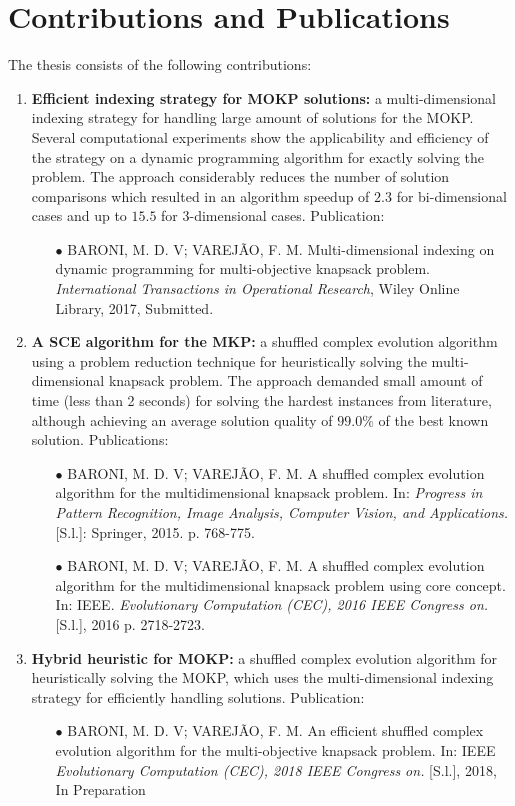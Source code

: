 \section{Contributions and Publications}

The thesis consists of the following contributions:
\begin{enumerate}
\item{
\textbf{Efficient indexing strategy for MOKP solutions:}
a multi-dimensional indexing strategy for handling large amount
of solutions for the MOKP.
Several computational experiments show the applicability and efficiency
of the strategy on a dynamic programming algorithm for exactly solving
the problem.
The approach considerably reduces the number of solution
comparisons which resulted in an algorithm speedup of $2.3$ for
bi-dimensional cases and up to $15.5$ for 3-dimensional cases.
Publication:
\begin{itemize}
 \item[{\tiny$\bullet$}] { BARONI, M. D. V; VAREJ\~AO, F. M. Multi-dimensional indexing on dynamic programming for multi-objective knapsack problem. \textit{International Transactions in Operational Research}, Wiley Online Library, 2017, Submitted. }
\end{itemize}
}
\item{
\textbf{A SCE algorithm for the MKP:}
a shuffled complex evolution algorithm using a
problem reduction technique for heuristically solving the multi-dimensional
knapsack problem.
The approach demanded small amount of time (less than 2 seconds)
for solving the hardest instances from literature,
although achieving an average solution quality of $99.0\%$
of the best known solution.
Publications:
\begin{itemize}
  \item[{\tiny$\bullet$}] { BARONI, M. D. V; VAREJ\~AO, F. M. A shuffled complex evolution algorithm
  for the multidimensional knapsack problem. In: \textit{Progress in Pattern Recognition, Image Analysis, Computer Vision, and Applications.} [S.l.]: Springer, 2015. p. 768-775. }
 \item[{\tiny$\bullet$}] { BARONI, M. D. V; VAREJ\~AO, F. M. A shuffled complex evolution algorithm
  for the multidimensional knapsack problem using core concept. In: IEEE. \textit{Evolutionary Computation (CEC), 2016 IEEE Congress on.} [S.l.], 2016 p. 2718-2723. }
\end{itemize}
}
\item{
\textbf{Hybrid heuristic for MOKP:}
a shuffled complex evolution algorithm for
heuristically solving the MOKP, which uses the multi-dimensional
indexing strategy for efficiently handling solutions.
Publication:
\begin{itemize}
 \item[{\tiny$\bullet$}] { BARONI, M. D. V; VAREJ\~AO, F. M. An efficient shuffled complex evolution algorithm for the multi-objective knapsack problem. In: IEEE \textit{Evolutionary Computation (CEC), 2018 IEEE Congress on.} [S.l.], 2018, In Preparation }
\end{itemize}
}
\end{enumerate}

